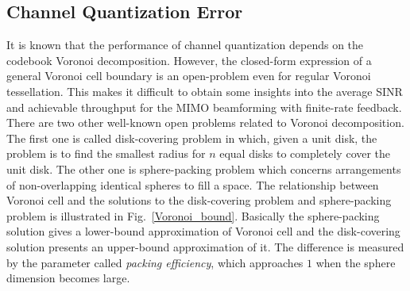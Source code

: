 \documentclass[10pt,fleqn, twocolumn]{IEEEtran}
\begin{document}
\subsection{Channel Quantization Error}
\begin{figure}
\end{figure}
It is known that the performance of channel quantization depends
on the codebook Voronoi decomposition. However, the closed-form
expression of a general Voronoi cell boundary is an open-problem
even for regular Voronoi tessellation. This makes it difficult to
obtain some insights into the average SINR and achievable
throughput for the MIMO beamforming with finite-rate feedback.
There are two other well-known open problems related to Voronoi
decomposition. The first one is called disk-covering problem in
which, given a unit disk, the problem is to find the smallest
radius for $n$ equal disks to completely cover the unit disk. The
other one is sphere-packing problem which concerns arrangements of
non-overlapping identical spheres to fill a space. The
relationship between Voronoi cell and the solutions to the
disk-covering problem and sphere-packing problem is illustrated in
Fig.~\ref{Voronoi_bound}. Basically the sphere-packing solution
gives a lower-bound approximation of Voronoi cell and the
disk-covering solution presents an upper-bound approximation of
it. The difference is measured by the parameter called {\em
packing efficiency}, which approaches $1$ when the sphere
dimension becomes large.
\end{document}
